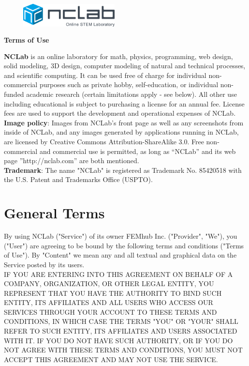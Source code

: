 \documentclass{article}
\begin{document}
\large

\vbox{}
\begin{figure}[!ht]
\includegraphics[width=5cm]{logo.png}
\vspace{4mm}
\end{figure}

\centerline{\huge \bf Terms of Use}
\vspace{6mm}
\noindent
{\bf NCLab} is an online laboratory for math, physics, programming, web design, solid modeling,
3D design, computer modeling of natural and technical processes, and scientific computing. It can 
be used free of charge for individual 
non-commercial purposes such as private hobby, self-education, or individual non-funded academic research (certain 
limitations apply - see below). All other use including educational is subject to purchasing a license 
for an annual fee. License fees are used to support the development and operational expenses of NCLab.\\

\noindent
{\bf Image policy}: Images from NCLab’s front page as well as any screenshots from inside of NCLab, and any images generated by applications running in NCLab, are licensed by Creative Commons Attribution-ShareAlike 3.0. Free non-commercial and commercial use is permitted, as long as “NCLab” and its web page ”http://nclab.com” are both mentioned.\\

\noindent
{\bf Trademark}: The name "NCLab" is registered as Trademark No. 85420518 with the U.S. Patent and Trademarks Office (USPTO).

\section*{General Terms}

By using NCLab ("Service") of its owner FEMhub Inc. ("Provider", "We"), you ("User") are agreeing to be bound by the following terms and conditions ("Terms of Use"). By "Content" we mean any and all textual and graphical data on the Service posted by its users. \\

\noindent
IF YOU ARE ENTERING INTO THIS AGREEMENT ON BEHALF OF A COMPANY, ORGANIZATION, OR OTHER LEGAL ENTITY, YOU REPRESENT THAT YOU HAVE THE AUTHORITY TO BIND SUCH ENTITY, ITS AFFILIATES AND ALL USERS WHO ACCESS OUR SERVICES THROUGH YOUR ACCOUNT TO THESE TERMS AND CONDITIONS, IN WHICH CASE THE TERMS "YOU" OR "YOUR" SHALL REFER TO SUCH ENTITY, ITS AFFILIATES AND USERS ASSOCIATED WITH IT. IF YOU DO NOT HAVE SUCH AUTHORITY, OR IF YOU DO NOT AGREE WITH THESE TERMS AND CONDITIONS, YOU MUST NOT ACCEPT THIS AGREEMENT AND MAY NOT USE THE SERVICE.\\
\end{document}
